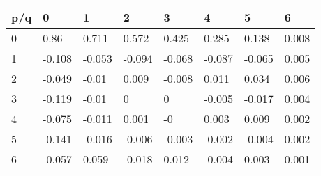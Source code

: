 \begin{tabular}{llllllll}
\toprule
p/q &      0 &      1 &      2 &      3 &      4 &      5 &      6 \\
\midrule
  0 &   0.86 &  0.711 &  0.572 &  0.425 &  0.285 &  0.138 &  0.008 \\
  1 & -0.108 & -0.053 & -0.094 & -0.068 & -0.087 & -0.065 &  0.005 \\
  2 & -0.049 &  -0.01 &  0.009 & -0.008 &  0.011 &  0.034 &  0.006 \\
  3 & -0.119 &  -0.01 &      0 &      0 & -0.005 & -0.017 &  0.004 \\
  4 & -0.075 & -0.011 &  0.001 &     -0 &  0.003 &  0.009 &  0.002 \\
  5 & -0.141 & -0.016 & -0.006 & -0.003 & -0.002 & -0.004 &  0.002 \\
  6 & -0.057 &  0.059 & -0.018 &  0.012 & -0.004 &  0.003 &  0.001 \\
\bottomrule
\end{tabular}
